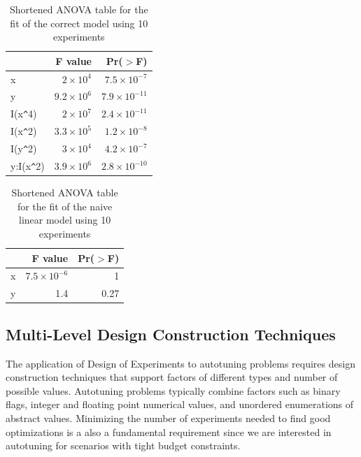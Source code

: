 \documentclass[conference]{IEEEtran}
\begin{document}
\begin{enumerate}
\begin{table}[ht]
\centering
\caption{Shortened ANOVA table for the fit of the correct model using 10 experiments}
\begingroup\small
\begin{tabular}{lrr}
  \toprule
 & F value & Pr($>$F) \\
  \midrule
x           & $2 \times 10^{4}$ & $7.5 \times 10^{-7}$ \\
  y           & $9.2 \times 10^{6}$ & $7.9 \times 10^{-11}$ \\
  I(x\verb|^|4)      & $2 \times 10^{7}$ & $2.4 \times 10^{-11}$ \\
  I(x\verb|^|2)      & $3.3 \times 10^{5}$ & $1.2 \times 10^{-8}$ \\
  I(y\verb|^|2)      & $3 \times 10^{4}$ & $4.2 \times 10^{-7}$ \\
  y:I(x\verb|^|2)    & $3.9 \times 10^{6}$ & $2.8 \times 10^{-10}$ \\
   \bottomrule
\end{tabular}
\endgroup
\end{table}

\begin{table}[ht]
\centering
\caption{Shortened ANOVA table for the fit of the naive linear model using 10 experiments}
\begingroup\small
\begin{tabular}{lrr}
  \toprule
 & F value & Pr($>$F) \\
  \midrule
x           & $7.5 \times 10^{-6}$ &   1 \\
  y           & 1.4 & 0.27 \\
   \bottomrule
\end{tabular}
\endgroup
\end{table}
\end{enumerate}
\subsection{Multi-Level Design Construction Techniques}
\label{sec:org869e5a1}
The application of Design of Experiments to autotuning problems requires design
construction techniques that support factors of different types and number of
possible values. Autotuning problems typically combine factors such as binary
flags, integer and floating point numerical values, and unordered enumerations
of abstract values. Minimizing the number of experiments needed to find good
optimizations is a also a fundamental requirement since we are interested in
autotuning for scenarios with tight budget constraints.
\end{document}
